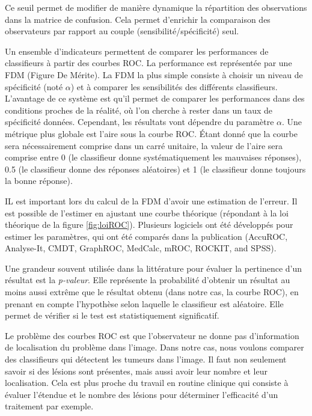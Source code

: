 Ce seuil permet de modifier de manière dynamique la répartition des observations dans la matrice de confusion.  Cela permet d'enrichir la comparaison des observateurs par rapport au couple (sensibilité/spécificité) seul.


Un ensemble d'indicateurs permettent de comparer les performances de classifieurs à partir des courbes ROC. La performance est représentée par une FDM (Figure De Mérite). La FDM la plus simple consiste à choisir un niveau de spécificité (noté $\alpha$) et à comparer les sensibilités des différents classifieurs. L'avantage de ce système est qu'il permet de comparer les performances dans des conditions proches de la réalité, où l'on cherche à rester dans un taux de spécificité données. Cependant, les résultats vont dépendre du paramètre $\alpha$. Une métrique plus globale est l'aire sous la courbe ROC. \'Etant donné que la courbe sera nécessairement comprise dans un carré unitaire, la valeur de l'aire sera comprise entre 0 (le classifieur donne systématiquement les mauvaises réponses), 0.5 (le classifieur donne des réponses aléatoires) et 1 (le classifieur donne toujours la bonne réponse)\cite{nie2006integrating}.

IL est important lors du calcul de la FDM d'avoir une estimation de l'erreur. Il est possible de l'estimer en ajustant une courbe théorique (répondant à la loi théorique de la figure \ref{fig:loiROC}). Plusieurs logiciels ont été développés pour estimer les paramètres, qui ont été comparés dans la publication \cite{CarstenStephan03012003} (AccuROC, Analyse-It, CMDT, GraphROC, MedCalc, mROC, ROCKIT, and SPSS).

\label{lab:p-valeur}
Une grandeur souvent utilisée dans la littérature pour évaluer la pertinence d'un résultat est la \emph{p-valeur}. Elle représente la probabilité d'obtenir un résultat au moins aussi extrême que le résultat obtenu (dans notre cas, la courbe ROC), en prenant en compte l'hypothèse selon laquelle le classifieur est aléatoire. Elle permet de vérifier si le test est statistiquement significatif.

Le problème des courbes ROC est que l'observateur ne donne pas d'information de localisation du problème dans l'image. Dans notre cas, nous voulons comparer des classifieurs qui détectent les tumeurs dans l'image. Il faut non seulement savoir si des lésions sont présentes, mais aussi avoir leur nombre et leur localisation. Cela est plus proche du travail en routine clinique qui consiste à évaluer l'étendue et le nombre des lésions pour déterminer l'efficacité d'un traitement par exemple. 

